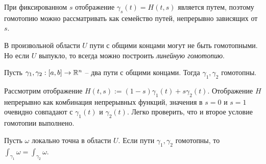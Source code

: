 \begin{note}
	При фиксированном $s$ отображение $\gamma_s(t) = H(t, s)$ является путем, поэтому гомотопию можно рассматривать как семейство путей, непрерывно зависящих от $s$.
\end{note}

В произвольной области $U$ пути с общими концами могут не быть гомотопными.
Но если $U$ выпукло, то всегда можно построить \textit{линейную гомотопию}.

\begin{example}
	Пусть $\gamma_1, \gamma_2 : [a, b] \to \mathbb{R}^n$ -- два пути с общими концами.
	Тогда $\gamma_1, \gamma_2$ гомотопны.
\end{example}

\begin{myproof}
	Рассмотрим отображение $H(t, s) := (1 - s) \gamma_1(t) + s \gamma_2(t)$. 
	Отображение $H$ непрерывно как комбинация непрерывных функций, значения в $s=0$ и $s=1$ очевидно совпадают с $\gamma_1(t)$ и $\gamma_2(t)$. 
	Легко проверить, что и второе условие гомотопии выполнено.
\end{myproof}



\begin{theorem}
	Пусть $\omega$ локально точна в области $U$. 
	Если пути $\gamma_1, \gamma_2$ гомотопны, то $\int_{\gamma_1} \omega = \int_{\gamma_2} \omega$.
\end{theorem}

